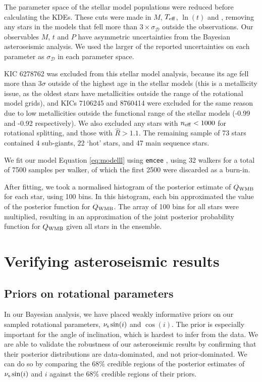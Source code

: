 The parameter space of the stellar model populations were reduced before calculating the KDEs. These cuts were made in $M$, $\mbox{$T_{\rm eff}$}$, $\ln(t)$ and \feh, removing any stars in the models that fell more than $3 \times \sigma_{\mathcal{D}}$ outside the observations. Our observables $M$, $t$ and $P$ have asymmetric uncertainties from the Bayesian asteroseismic analysis. We used the larger of the reported uncertainties on each parameter as $\sigma_{\mathcal{D}}$ in each parameter space. 

KIC 6278762 was excluded from this stellar model analysis, because its age fell more than $3\sigma$ outside of the highest age in the stellar models (this is a metallicity issue, as the oldest stars have metallicities outside the range of the rotational model grids), and KICs 7106245 and 8760414 were excluded for the same reason due to low metallicities outside the functional range of the stellar models (-0.99 and -0.92 respectively). We also excluded any stars with $n_{\rm eff} < 1000$ for rotational splitting, and those with $\hat{R} > 1.1$. The remaining sample of 73 stars contained 4 sub-giants, 22 `hot' stars, and 47 main sequence stars.

We fit our model Equation \ref{eq:modelll} using \texttt{emcee} \cite{m_foreman-mackey+2013, m_foreman-mackey2016}, using 32 walkers for a total of 7500 samples per walker, of which the first 2500 were discarded as a burn-in.

After fitting, we took a normalised histogram of the posterior estimate of $Q_{\rm WMB}$ for each star, using 100 bins. In this histogram, each bin approximated the value of the posterior function for $Q_{\rm WMB}$. The array of 100 bins for all stars were multiplied, resulting in an approximation of the joint posterior probability function for $Q_{\rm WMB}$ given all stars in the ensemble.

\section{Verifying asteroseismic results}
\subsection{Priors on rotational parameters}
In our Bayesian analysis, we have placed weakly informative priors on our sampled rotational parameters, $\nu_{\rm s}\sin(i)$ and $\cos(i)$. The prior is especially important for the angle of inclination, which is hardest to infer from the data. We are able to validate the robustness of our asteroseismic results by confirming that their posterior distributions are data-dominated, and not prior-dominated. We can do so by comparing the $68\%$ credible regions of the posterior estimates of $\nu_{\rm s}\sin(i)$ and $i$ against the $68\%$ credible regions of their priors.

